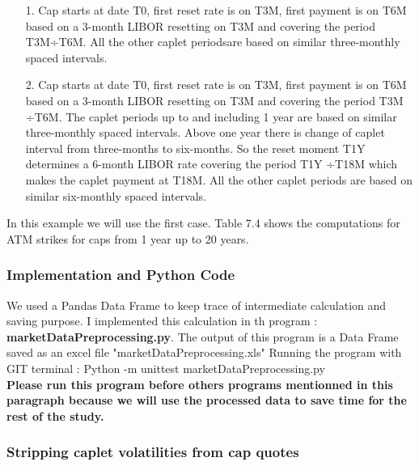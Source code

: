 \documentclass[11pt]{article}
\numberwithin{equation}{subsection}
\begin{document}
\begin{enumerate}
	\item [1.] Cap starts at date T0, first reset rate is on T3M, first payment is on T6M based on a 3-month
	LIBOR resetting on T3M and covering the period T3M÷T6M. All the other caplet periodsare based on similar three-monthly spaced intervals.
	\item [2.] Cap starts at date T0, first reset rate is on T3M, first payment is on T6M based on a 3-month LIBOR resetting on T3M and covering the period T3M ÷T6M. The caplet periods up to and including 1 year are based on similar three-monthly spaced intervals. Above one year there is change of caplet interval from three-months to six-months. So the reset moment T1Y determines a 6-month LIBOR rate covering the period T1Y ÷T18M which makes the caplet payment at T18M. All the other caplet periods are based on similar six-monthly spaced intervals.
\end{enumerate}

In this example we will use the first case.
Table 7.4 shows the computations for ATM strikes for caps from 1 year up to 20 years.

\subsubsection{Implementation and Python Code}
We used a Pandas Data Frame to keep trace of intermediate calculation and saving purpose. I implemented this calculation in th program : \textbf{marketDataPreprocessing.py}. The output of this program is a Data Frame saved as an excel file "marketDataPreprocessing.xls" 
Running the program with GIT terminal  : Python -m unittest marketDataPreprocessing.py\\
\textbf{Please run this program before others programs mentionned in this paragraph because we will use the processed data to save time for the rest of the study.}

\subsubsection{Stripping caplet volatilities from cap quotes}
\end{document}
